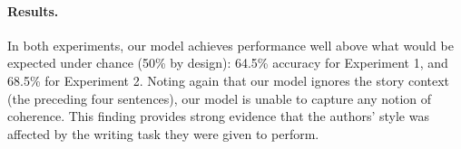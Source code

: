 \documentclass[11pt,a4paper]{article}
\newcommand{\figref}[1]{Figure~\ref{#1}}
\newcommand{\tabref}[1]{Table~\ref{#1}}
\newcommand{\com}[1]{}
\newcommand{\resolved}[1]{}
\newcommand{\shortv}[1]{}
\newcommand{\roy}[1]{{\color{orange}\textsc{[#1 --rs]}}}
\newcommand{\yc}[1]{{\color{bblue}\{\textit{#1}\}$_{yc}$}}
\newcommand{\nascomment}[1]{{\color{blue}\textsc{[#1 --nas]}}}
\newcommand{\clinic}[1]{{\color{magenta}\textsc{[#1 --CLINIC]}}}
\renewcommand{\roy}[1]{{\color{orange}[#1 --rs]}}
\renewcommand{\roy}[1]{#1}
\renewcommand{\nascomment}[1]{}
\renewcommand{\yc}[1]{}
\begin{document}
\paragraph{Results.}
\shortv{\tabref{results} shows our results.  }In both experiments,
our model achieves performance well above what would be expected under
chance (50\% by design)\roy{: 64.5\% accuracy for Experiment 1, and 68.5\% for Experiment 2.}
Noting again that our model ignores the
story context (the preceding four sentences), our model is unable to
capture any notion of coherence.   This finding provides
strong evidence that the authors' style was affected by the writing task they
were given to perform.\com{  On our third task, which compared 
\emph{original} vs.~\emph{wrong (new)} endings, even stronger
differences were apparent to the model, allowing over 75\% accuracy.}


\resolved{\nascomment{I rewrote this section.  old version commented out in
  latex source}}

\end{document}
